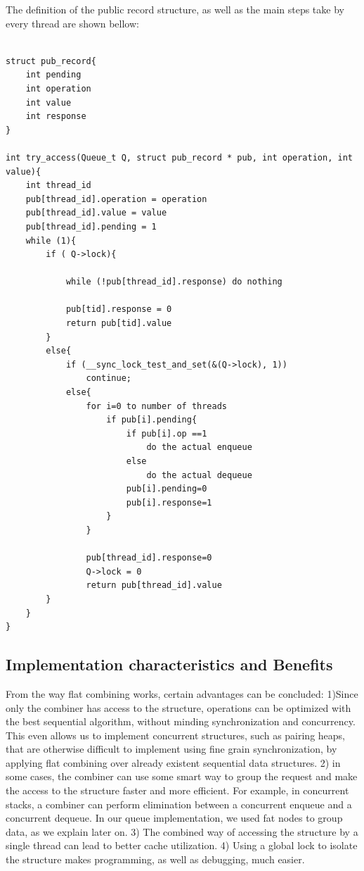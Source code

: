 The definition of the public record structure, as well as the main steps take by every thread are shown bellow:

\begin{lstlisting}[caption={Basic layout of flat combining}]

struct pub_record{
	int pending
	int operation
	int value
	int response
} 

int try_access(Queue_t Q, struct pub_record * pub, int operation, int value){
	int thread_id
	pub[thread_id].operation = operation
	pub[thread_id].value = value
	pub[thread_id].pending = 1
	while (1){
		if ( Q->lock){

			while (!pub[thread_id].response) do nothing
			
			pub[tid].response = 0
			return pub[tid].value
		}
		else{
			if (__sync_lock_test_and_set(&(Q->lock), 1)) 
				continue;
			else{
				for i=0 to number of threads
					if pub[i].pending{
						if pub[i].op ==1
							do the actual enqueue
						else
							do the actual dequeue
						pub[i].pending=0
						pub[i].response=1
					}
				}
				
				pub[thread_id].response=0
				Q->lock = 0
				return pub[thread_id].value
		}
	}
}				

\end{lstlisting}

\subsection{Implementation characteristics and Benefits}
From the way flat combining works, certain advantages can be concluded:
1)Since only the combiner has access to the structure, operations can be optimized with the best sequential algorithm, without minding synchronization and concurrency. This even allows us to implement concurrent structures, such as pairing heaps, that are otherwise difficult to implement using fine grain synchronization, by applying flat combining over already existent sequential data structures.
2) in some cases, the combiner can use some smart way to group the request and make the access to the structure faster and more efficient. For example, in concurrent stacks, a combiner can perform elimination between a concurrent enqueue and a concurrent dequeue. In our queue implementation, we used fat nodes to group data, as we explain later on.
3) The combined way of accessing the structure by a single thread can lead to better cache utilization.
4) Using a global lock to isolate the structure makes programming, as well as debugging, much easier.

